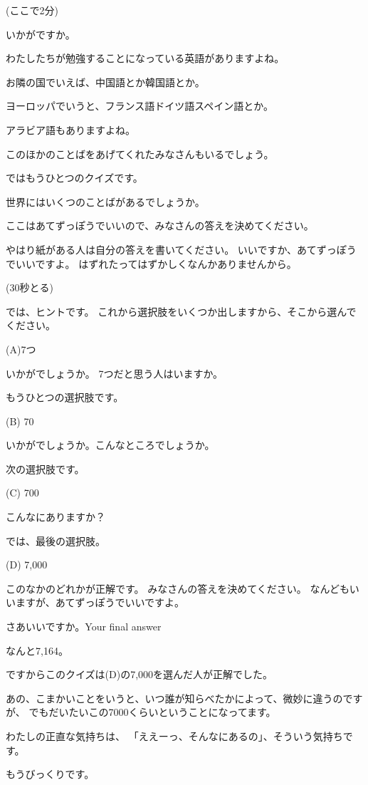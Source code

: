 \documentclass[12pt]{jlreq}
\begin{document}
(ここで2分)

いかがですか。

わたしたちが勉強することになっている英語がありますよね。

お隣の国でいえば、中国語とか韓国語とか。

ヨーロッパでいうと、フランス語ドイツ語スペイン語とか。


アラビア語もありますよね。

このほかのことばをあげてくれたみなさんもいるでしょう。

\hrulefill

ではもうひとつのクイズです。

世界にはいくつのことばがあるでしょうか。

ここはあてずっぽうでいいので、みなさんの答えを決めてください。

やはり紙がある人は自分の答えを書いてください。
いいですか、あてずっぽうでいいですよ。
はずれたってはずかしくなんかありませんから。

(30秒とる)

では、ヒントです。
これから選択肢をいくつか出しますから、そこから選んでください。

(A)7つ

いかがでしょうか。
7つだと思う人はいますか。

もうひとつの選択肢です。

(B) 70

いかがでしょうか。こんなところでしょうか。

次の選択肢です。

(C) 700

こんなにありますか？

では、最後の選択肢。

(D) 7,000


このなかのどれかが正解です。
みなさんの答えを決めてください。
なんどもいいますが、あてずっぽうでいいですよ。

さあいいですか。Your final answer

\hrulefill

なんと7,164。

ですからこのクイズは(D)の7,000を選んだ人が正解でした。

あの、こまかいことをいうと、いつ誰が知らべたかによって、微妙に違うのですが、
でもだいたいこの7000くらいということになってます。

\hrulefill

わたしの正直な気持ちは、
「ええーっ、そんなにあるの」、そういう気持ちです。

もうびっくりです。
\end{document}
